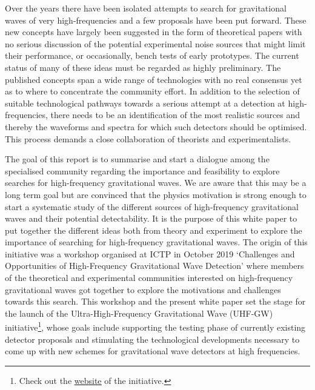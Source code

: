 \documentclass[11pt,a4paper]{article}
\begin{document}
Over the years there have been isolated attempts to search for gravitational waves of very high-frequencies and a few proposals have been put forward. These new concepts have largely been suggested in the form of theoretical papers with no serious discussion of the potential experimental noise sources that might limit their performance, or occasionally, bench tests of early prototypes. The current status of many of these ideas must be regarded as highly preliminary. The published concepts span a wide range of technologies with no real consensus yet as to where to concentrate the community effort. In addition to the selection of suitable technological pathways towards a serious attempt at a detection at high-frequencies, there needs to be an identification of the most realistic sources and thereby the waveforms and spectra for which such detectors should be optimised. This process demands a close collaboration of theorists and experimentalists.
%

The goal of this report is to summarise and start a dialogue among the specialised community regarding the importance and feasibility to explore searches for high-frequency gravitational waves. We are aware that this may be a long term goal but are convinced that the physics motivation is strong enough to start a systematic study of the different sources of high-frequency gravitational waves and their potential detectability. It is the purpose of this white paper to put together the different ideas both from theory and experiment to explore the importance of searching for high-frequency gravitational waves. The origin of this initiative was a workshop organised at ICTP in October 2019 `Challenges and Opportunities of High-Frequency Gravitational Wave Detection' where members of the theoretical and experimental communities interested on high-frequency gravitational waves got together to explore the motivations and challenges towards this search. This workshop and the present white paper set the stage for the launch of the Ultra-High-Frequency Gravitational Wave (UHF-GW) initiative\footnote{Check out the \href{http://www.ctc.cam.ac.uk/activities/UHF-GW.php}{\underline{website}} of the initiative.}, whose goals include supporting the testing phase of currently existing detector proposals and stimulating the technological developments necessary to come up with new schemes for gravitational wave detectors at high frequencies.
\end{document}
